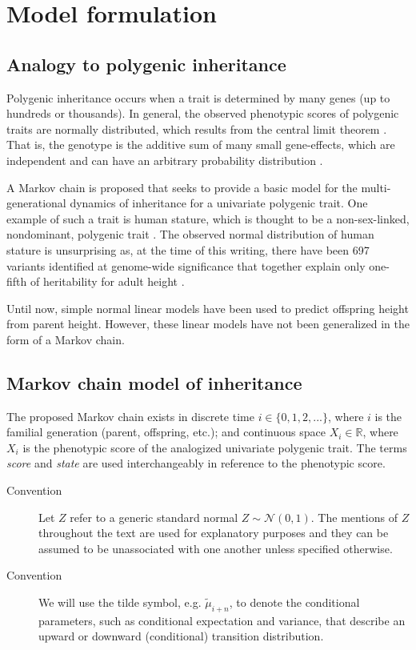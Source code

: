 \documentclass[letterpaper,10pt]{article} %
\begin{document}
\section{Model formulation}

\subsection{Analogy to polygenic inheritance}
Polygenic inheritance occurs when a trait is determined by many genes (up to hundreds or thousands). In general, the observed phenotypic scores of polygenic traits are normally distributed, which results from the central limit theorem \cite{rieger}. That is, the genotype is the additive sum of many small gene-effects, which are independent and can have an arbitrary probability distribution \cite{lange_book}. 

A Markov chain is proposed that seeks to provide a basic model for the multi-generational dynamics of inheritance for a univariate polygenic trait. One example of such a trait is human stature, which is thought to be a non-sex-linked, nondominant, polygenic trait \cite{luo}. The observed normal distribution of human stature is unsurprising as, at the time of this writing, there have been 697 variants identified at genome-wide significance that together explain only one-fifth of heritability for adult height \cite{preece, wood}. 

Until now, simple normal linear models have been used to predict offspring height from parent height. However, these linear models have not been generalized in the form of a Markov chain. 

\subsection{Markov chain model of inheritance}


The proposed Markov chain exists in discrete time $ i \in \{0, 1, 2,...\}$, where $i$ is the familial generation (parent, offspring, etc.); and continuous space $X_i \in \mathbb{R}$, where $X_i$ is the phenotypic score of the analogized univariate polygenic trait. The terms \emph{score} and \emph{state} are used interchangeably in reference to the phenotypic score. 

\begin{description}
\item [Convention] Let $Z$ refer to a generic standard normal $Z \sim \mathcal{N}(0, 1)$. The mentions of $Z$ throughout the text are used for explanatory purposes and they can be assumed to be unassociated with one another unless specified otherwise.
\item [Convention] We will use the tilde symbol, e.g. $\tilde{\mu}_{i+n}$, to denote the conditional parameters, such as conditional expectation and variance, that describe an upward or downward (conditional) transition distribution.
\end{description}
\end{document}
